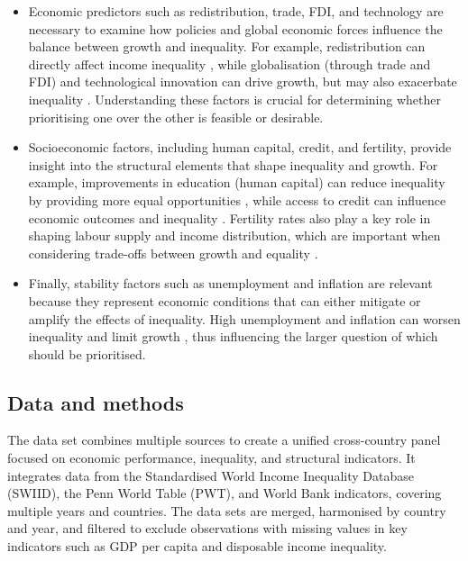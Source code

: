 \documentclass[12pt]{article}
\begin{document}
\begin{itemize}
    \item Economic predictors such as redistribution, trade, FDI, and technology are necessary to examine how policies and global economic forces influence the balance between growth and inequality. For example, redistribution can directly affect income inequality \parencite{berg2018redistribution}, while globalisation (through trade and FDI) and technological innovation can drive growth, but may also exacerbate inequality \parencite{singh2004globalization}. Understanding these factors is crucial for determining whether prioritising one over the other is feasible or desirable.
    \item Socioeconomic factors, including human capital, credit, and fertility, provide insight into the structural elements that shape inequality and growth. For example, improvements in education (human capital) can reduce inequality by providing more equal opportunities \parencite{andersen2018human}, while access to credit can influence economic outcomes and inequality \parencite{dwyer2018credit}. Fertility rates also play a key role in shaping labour supply and income distribution, which are important when considering trade-offs between growth and equality \parencite{de2003inequality}.
    \item Finally, stability factors such as unemployment and inflation are relevant because they represent economic conditions that can either mitigate or amplify the effects of inequality. High unemployment and inflation can worsen inequality and limit growth \parencite{stiglitz2015macroeconomic}, thus influencing the larger question of which should be prioritised.
\end{itemize}

\subsection{Data and methods}

The data set combines multiple sources to create a unified cross-country panel focused on economic performance, inequality, and structural indicators. It integrates data from the Standardised World Income Inequality Database (SWIID), the Penn World Table (PWT), and World Bank indicators, covering multiple years and countries. The data sets are merged, harmonised by country and year, and filtered to exclude observations with missing values in key indicators such as GDP per capita and disposable income inequality.
\end{document}
